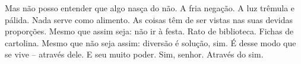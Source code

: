 \noindent Mas não posso entender que algo nasça do não. A fria negação. A luz
trêmula e pálida. Nada serve como alimento. As coisas têm de ser
vistas nas suas devidas proporções. Mesmo que assim seja: não ir à
festa. Rato de biblioteca. Fichas de cartolina. Mesmo que não seja
assim: diversão é solução, sim. É desse modo que se vive – através
dele. E seu muito poder. Sim, senhor. Através do sim.